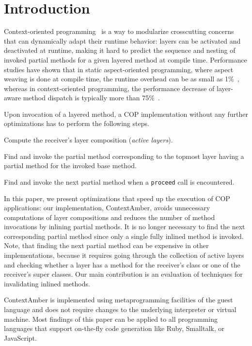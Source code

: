 \documentclass{sig-alternate}
\begin{document}
\section{Introduction}
Context-oriented programming~\cite{hirschfeld2008context} is a way to modularize crosscutting concerns that can dynamically adapt their runtime behavior: layers can be activated and deactivated at runtime, making it hard to predict the sequence and nesting of invoked partial methods for a given layered method at compile time. Performance studies have shown that in static aspect-oriented programming, where aspect weaving is done at compile time, the runtime overhead can be as small as 1\%~\cite{Colyer:2003:UAC:949344.949440}, whereas in context-oriented programming, the performance decrease of layer-aware method dispatch is typically more than 75\%~\cite{Appeltauer:2009:CCP:1562112.1562118}.

Upon invocation of a layered method, a COP implementation without any further optimizations has to perform the following steps.
\begin{compact_enum}
    \item Compute the receiver's layer composition (\emph{active layers}).
    \item Find and invoke the partial method corresponding to the topmost layer having a partial method for the invoked base method.
    \item Find and invoke the next partial method when a \texttt{proceed} call is encountered.
\end{compact_enum}

In this paper, we present optimizations that speed up the execution of COP applications: our implementation, ContextAmber, avoids unnecessary computations of layer compositions and reduces the number of method invocations by inlining partial methods. It is no longer necessary to find the next corresponding partial method since only a single fully inlined method is invoked. Note, that finding the next partial method can be expensive in other implementations, because it
requires going through the collection of active layers and checking whether a layer has a method for the receiver's class or one of the receiver's super classes. Our main contribution is an evaluation of techniques for invalidating inlined methods. 

ContextAmber is implemented using metaprogramming facilities of the guest language and does not require changes to the underlying interpreter or virtual machine. Most findings of this paper can be applied to all programming languages that support on-the-fly code generation like Ruby, Smalltalk, or JavaScript.
\end{document}
